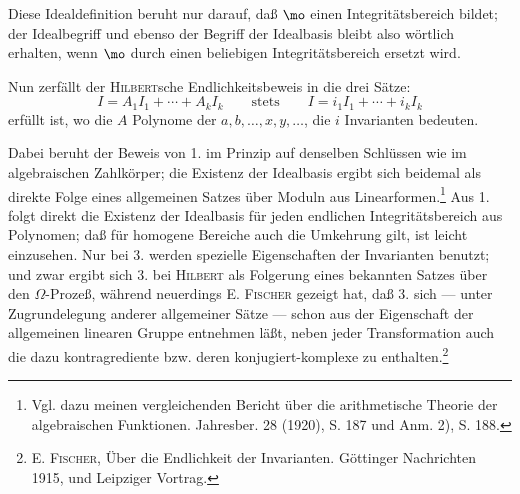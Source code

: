 Diese Idealdefinition beruht nur darauf, daß $\mo$ einen Integritätsbereich bildet; der Idealbegriff und ebenso der Begriff der Idealbasis bleibt also wörtlich erhalten, wenn $\mo$ durch einen beliebigen Integritätsbereich ersetzt wird.

Nun zerfällt der \textsc{Hilbert}sche Endlichkeitsbeweis in die drei Sätze:
\[
 I=A_1I_1+\cdots+A_kI_k
 \qquad\text{stets}\qquad
 I=i_1I_1+\cdots+i_kI_k
\]
erfüllt ist, wo die $A$ Polynome der $a,b,\ldots,x,y,\ldots$, die $i$ Invarianten bedeuten.

Dabei beruht der Beweis von 1. im Prinzip auf denselben Schlüssen wie im algebraischen Zahlkörper; die Existenz der Idealbasis ergibt sich beidemal als direkte Folge eines allgemeinen Satzes über Moduln aus Linearformen.\footnote{Vgl. dazu meinen vergleichenden Bericht über die arithmetische Theorie der algebraischen Funktionen. Jahresber. 28 (1920), S. 187 und Anm. 2), S. 188.} Aus 1. folgt direkt die Existenz der Idealbasis für jeden endlichen Integritätsbereich aus Polynomen; daß für homogene Bereiche auch die Umkehrung gilt, ist leicht einzusehen. Nur bei 3. werden spezielle Eigenschaften der Invarianten benutzt; und zwar ergibt sich 3. bei \textsc{Hilbert} als Folgerung eines bekannten Satzes über den $\Omega$-Prozeß, während neuerdings E. \textsc{Fischer} gezeigt hat, daß 3. sich --- unter Zugrundelegung anderer allgemeiner Sätze --- schon aus der Eigenschaft der allgemeinen linearen Gruppe entnehmen läßt, neben jeder Transformation auch die dazu kontragrediente bzw. deren konjugiert-komplexe zu enthalten.\footnote{E. \textsc{Fischer}, Über die Endlichkeit der Invarianten. Göttinger Nachrichten 1915, und Leipziger Vortrag.}

